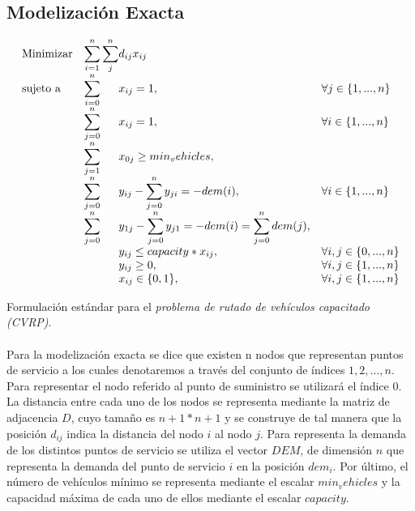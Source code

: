 \documentclass[spanish]{article}
\begin{document}
		\subsection{Modelización Exacta}
		\label{sec:exact_formulation}

			\begin{eqfloat}
				\begin{equation}
					\begin{array}{ll@{}ll}
						\text{Minimizar}	& \displaystyle\sum\limits_{i = 1}^{n}	\sum\limits_{j}^{n} & d_{ij}x_{ij} & \\
						\text{sujeto a}		& \displaystyle\sum\limits_{i = 0}^{n}	&	x_{ij} 	= 1, 		& \forall j \in \{1,...,n\}\\
															& \displaystyle\sum\limits_{j = 0}^{n}	&	x_{ij} 	= 1,		& \forall i \in \{1,...,n\}\\
															& \displaystyle\sum\limits_{j = 1}^{n}	&	x_{0j} 	\geq min_vehicles,	&\\
															& \displaystyle\sum\limits_{j = 0}^{n}	&	y_{ij} - \displaystyle\sum\limits_{j = 0}^{n}	y_{ji} = -dem(i),  & \forall i \in \{1,...,n\}\\
															& \displaystyle\sum\limits_{j = 0}^{n}	&	y_{1j} - \displaystyle\sum\limits_{j = 0}^{n}	y_{j1} = -dem(i)	= \displaystyle\sum\limits_{j = 0}^{n} dem(j),  &\\
															&																				&	y_{ij} 	\leq capacity * x_{ij},  & \forall i,j \in \{0,...,n\}\\
															&                               				&	y_{ij} 	\geq 0, 	& \forall i,j \in \{1,...,n\} \\
															&                               				&	x_{ij} 	\in \{0,1\}, 	& \forall i,j \in \{1,...,n\}
					\end{array}
				\end{equation}
				\caption{Formulación estándar para el \emph{problema de rutado de vehículos capacitado (CVRP)}.}
				\label{eq:tsp_basic}
			\end{eqfloat}

			\paragraph{}
			Para la modelización exacta se dice que existen n nodos que representan puntos de servicio a los cuales denotaremos a través del conjunto de índices ${1,2,...,n}$. Para representar el nodo referido al punto de suministro se utilizará el índice $0$. La distancia entre cada uno de los nodos se representa mediante la matriz de adjacencia $D$, cuyo tamaño es $n+1*n+1$ y se construye de tal manera que la posición $d_{ij}$ indica la distancia del nodo $i$ al nodo $j$. Para representa la demanda de los distintos puntos de servicio se utiliza el vector $DEM$, de dimensión $n$ que representa la demanda del punto de servicio $i$ en la posición $dem_i$. Por último, el número de vehículos mínimo se representa mediante el escalar $min_vehicles$ y la capacidad máxima de cada uno de ellos mediante el escalar $capacity$.
\end{document}
